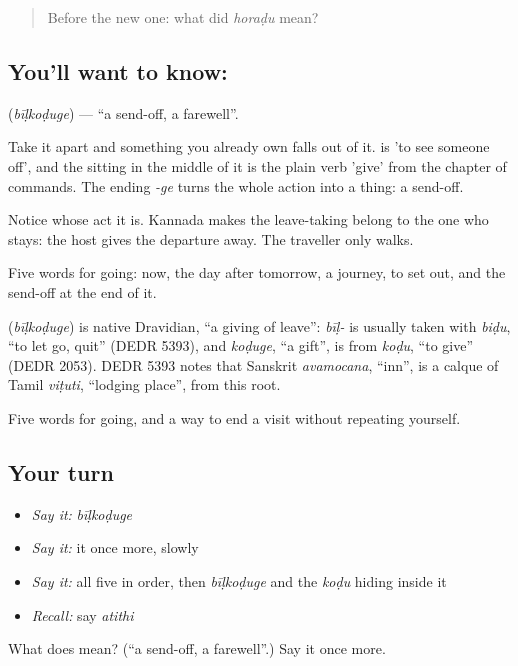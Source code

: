 \begin{quote}
Before the new one: what did \emph{horaḍu} mean?
\end{quote}

\subsection*{You'll want to know: }
\textbf{} (\emph{bīḷkoḍuge}) — \textquotedblleft{}a send-off, a farewell\textquotedblright{}.

Take it apart and something you already own falls out of it.  is 'to see someone off', and the  sitting in the middle of it is the plain verb 'give' from the chapter of commands. The ending \emph{-ge} turns the whole action into a thing: a send-off.

Notice whose act it is. Kannada makes the leave-taking belong to the one who stays: the host gives the departure away. The traveller only walks.

Five words for going: now, the day after tomorrow, a journey, to set out, and the send-off at the end of it.

\begin{cousinweb}
\textbf{} (\emph{bīḷkoḍuge}) is native Dravidian, \textquotedblleft{}a giving of leave\textquotedblright{}: \emph{bīḷ-} is usually taken with \emph{biḍu}, \textquotedblleft{}to let go, quit\textquotedblright{} (DEDR 5393), and \emph{koḍuge}, \textquotedblleft{}a gift\textquotedblright{}, is from \emph{koḍu}, \textquotedblleft{}to give\textquotedblright{} (DEDR 2053). DEDR 5393 notes that Sanskrit \emph{avamocana}, \textquotedblleft{}inn\textquotedblright{}, is a calque of Tamil \emph{viṭuti}, \textquotedblleft{}lodging place\textquotedblright{}, from this root.
\end{cousinweb}

\begin{grammarlens}[title={What you've built}]
Five words for going, and a way to end a visit without repeating yourself.
\end{grammarlens}

\subsection*{Your turn}
\begin{itemize}
\raggedright
  \item \emph{Say it:} \emph{bīḷkoḍuge}
  \item \emph{Say it:} it once more, slowly
  \item \emph{Say it:} all five in order, then \emph{bīḷkoḍuge} and the \emph{koḍu} hiding inside it
  \item \emph{Recall:} say \emph{atithi}
\end{itemize}

\begin{tcolorbox}[breakable,colback=teal!4,colframe=teal!35!black,title={Before you move on}]
What does  mean? (\textquotedblleft{}a send-off, a farewell\textquotedblright{}.) Say it once more.
\end{tcolorbox}
